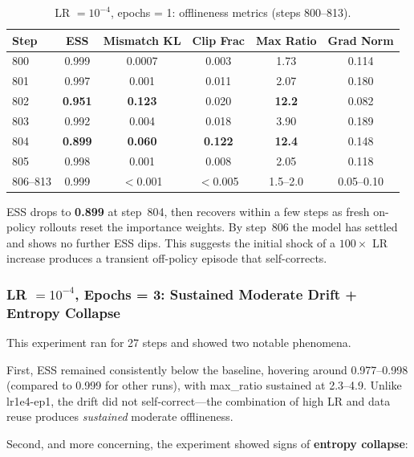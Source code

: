 \documentclass[11pt,a4paper]{article}
\begin{document}
\begin{table}[H]
\centering
\caption{LR $= 10^{-4}$, epochs = 1: offlineness metrics (steps 800--813).}
\label{tab:lr1e4_ep1}
\begin{tabular}{@{}lccccc@{}}
\toprule
\textbf{Step} & \textbf{ESS} & \textbf{Mismatch KL} & \textbf{Clip Frac} & \textbf{Max Ratio} & \textbf{Grad Norm} \\
\midrule
800 & 0.999 & 0.0007  & 0.003 & 1.73  & 0.114 \\
801 & 0.997 & 0.001   & 0.011 & 2.07  & 0.180 \\
802 & \textbf{0.951} & \textbf{0.123} & 0.020 & \textbf{12.2} & 0.082 \\
803 & 0.992 & 0.004   & 0.018 & 3.90  & 0.189 \\
804 & \textbf{0.899} & \textbf{0.060} & \textbf{0.122} & \textbf{12.4} & 0.148 \\
805 & 0.998 & 0.001   & 0.008 & 2.05  & 0.118 \\
806--813 & 0.999 & $<$0.001 & $<$0.005 & 1.5--2.0 & 0.05--0.10 \\
\bottomrule
\end{tabular}
\end{table}

ESS drops to \textbf{0.899} at step~804, then recovers within a few steps as
fresh on-policy rollouts reset the importance weights. By step~806 the model has
settled and shows no further ESS dips. This suggests the initial shock of a
$100\times$ LR increase produces a transient off-policy episode that
self-corrects.

\subsubsection{LR $= 10^{-4}$, Epochs = 3: Sustained Moderate Drift + Entropy Collapse}

This experiment ran for 27 steps and showed two notable phenomena.

First, ESS remained consistently below the baseline, hovering around
0.977--0.998 (compared to 0.999 for other runs), with max\_ratio sustained at
2.3--4.9. Unlike lr1e4-ep1, the drift did not self-correct---the combination of
high LR and data reuse produces \emph{sustained} moderate offlineness.

Second, and more concerning, the experiment showed signs of \textbf{entropy
collapse}:
\end{document}
